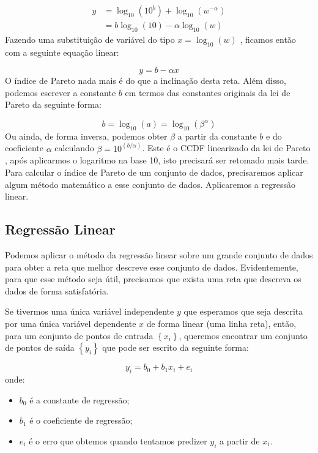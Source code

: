 \begin{equation}
    \begin{split}
        y	     &=\log_{10}\left(10^{b}\right)+\log_{10}\left(w^{-\alpha}\right) \\
        &=b\log_{10}\left(10\right)-\alpha\log_{10}\left(w\right)
    \end{split}
\end{equation}
Fazendo  uma substituição de variável do tipo $x=\log_{10}\left( w \right)$ , ficamos então com a seguinte equação linear:

$$y=b-\alpha x$$
O índice de Pareto nada mais é do que a inclinação desta reta. Além disso, podemos escrever a constante $b$  em termos das constantes  originais da lei de Pareto da seguinte forma:

$$b=\log_{10}\left(a\right)=\log_{10}\left(\beta^{\alpha}\right)$$
Ou ainda, de forma inversa, podemos obter $\beta$  a partir da constante $b$ e do coeficiente $\alpha$ calculando $\beta=10^{\left(b/\alpha\right)}$.  Este é o CCDF linearizado da lei de Pareto , após aplicarmos o logaritmo na base 10, isto precisará ser retomado mais tarde. Para calcular o índice de Pareto de um conjunto de dados, precisaremos aplicar algum método matemático a esse conjunto de dados.  Aplicaremos a  regressão linear.

\subsection*{Regressão Linear}

Podemos aplicar o método da regressão linear  sobre um grande conjunto de dados para obter a reta que melhor descreve esse conjunto de dados. Evidentemente, para que esse método seja útil, precisamos que exista uma reta que descreva os dados de forma satisfatória. 

Se tivermos uma única variável independente $y$ que esperamos que seja descrita por uma única variável dependente $x$ de forma linear (uma linha reta), então, para um conjunto de pontos de entrada $\left\{ x_{i}\right\}$, queremos encontrar um conjunto de pontos de saída $\left\{ y_{i}\right\}$ que pode ser escrito da seguinte forma:

$$y_{i}=b_{0}+b_{1}x_{i}+e_{i}$$
onde:

\begin{itemize}
    \item $b_0$  é a constante de regressão;
    \item $b_1$  é o coeficiente de regressão;
    \item $e_i$  é o erro que obtemos quando tentamos predizer  $y_{i}$  a partir de  $x_{i}$.
\end{itemize}

